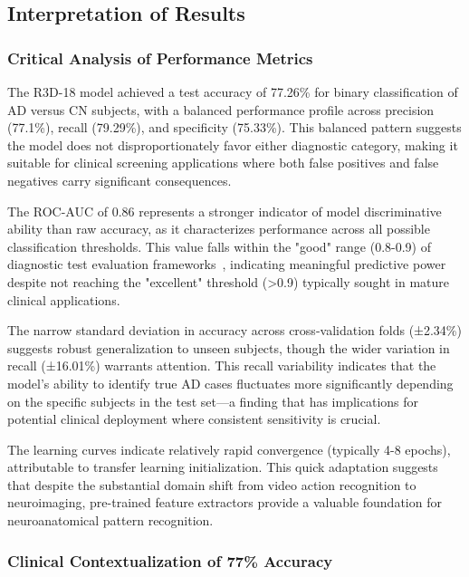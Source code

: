 \documentclass[12pt, a4paper]{article}
\begin{document}
\subsection{Interpretation of Results}

\subsubsection{Critical Analysis of Performance Metrics}

The R3D-18 model achieved a test accuracy of 77.26\% for binary classification of AD versus CN subjects, with a balanced performance profile across precision (77.1\%), recall (79.29\%), and specificity (75.33\%). This balanced pattern suggests the model does not disproportionately favor either diagnostic category, making it suitable for clinical screening applications where both false positives and false negatives carry significant consequences.

The ROC-AUC of 0.86 represents a stronger indicator of model discriminative ability than raw accuracy, as it characterizes performance across all possible classification thresholds. This value falls within the "good" range (0.8-0.9) of diagnostic test evaluation frameworks~\cite{mandrekar2010receiver}, indicating meaningful predictive power despite not reaching the "excellent" threshold (>0.9) typically sought in mature clinical applications.

The narrow standard deviation in accuracy across cross-validation folds (±2.34\%) suggests robust generalization to unseen subjects, though the wider variation in recall (±16.01\%) warrants attention. This recall variability indicates that the model's ability to identify true AD cases fluctuates more significantly depending on the specific subjects in the test set—a finding that has implications for potential clinical deployment where consistent sensitivity is crucial.

The learning curves indicate relatively rapid convergence (typically 4-8 epochs), attributable to transfer learning initialization. This quick adaptation suggests that despite the substantial domain shift from video action recognition to neuroimaging, pre-trained feature extractors provide a valuable foundation for neuroanatomical pattern recognition.

\subsubsection{Clinical Contextualization of 77\% Accuracy}
\end{document}
